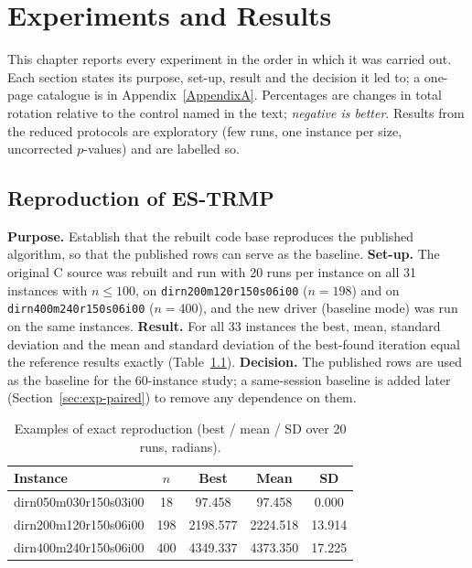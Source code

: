 
\chapter{Experiments and Results} %

\label{Chapter4} %


This chapter reports every experiment in the order in which it was carried out. Each section states its purpose, set-up, result and the decision it led to; a one-page catalogue is in Appendix~\ref{AppendixA}. Percentages are changes in total rotation relative to the control named in the text; \emph{negative is better}. Results from the reduced protocols are exploratory (few runs, one instance per size, uncorrected $p$-values) and are labelled so.


\section{Reproduction of ES-TRMP}\label{sec:exp-repro}

\textbf{Purpose.} Establish that the rebuilt code base reproduces the published algorithm, so that the published rows can serve as the baseline. \textbf{Set-up.} The original C source was rebuilt and run with 20 runs per instance on all 31 instances with $n\le100$, on \texttt{dirn200m120r150s06i00} ($n=198$) and on \texttt{dirn400m240r150s06i00} ($n=400$), and the new driver (baseline mode) was run on the same instances. \textbf{Result.} For all 33 instances the best, mean, standard deviation and the mean and standard deviation of the best-found iteration equal the reference results exactly (Table~\ref{tab:repro}). \textbf{Decision.} The published rows are used as the baseline for the 60-instance study; a same-session baseline is added later (Section~\ref{sec:exp-paired}) to remove any dependence on them.

\begin{table}[htbp]
\centering
\caption{Examples of exact reproduction (best / mean / SD over 20 runs, radians).}
\label{tab:repro}
\small
\begin{tabular}{lcccc}
\toprule
\textbf{Instance} & $n$ & \textbf{Best} & \textbf{Mean} & \textbf{SD}\\
\midrule
dirn050m030r150s03i00 & 18 & 97.458 & 97.458 & 0.000\\
dirn200m120r150s06i00 & 198 & 2198.577 & 2224.518 & 13.914\\
dirn400m240r150s06i00 & 400 & 4349.337 & 4373.350 & 17.225\\
\bottomrule
\end{tabular}
\end{table}

